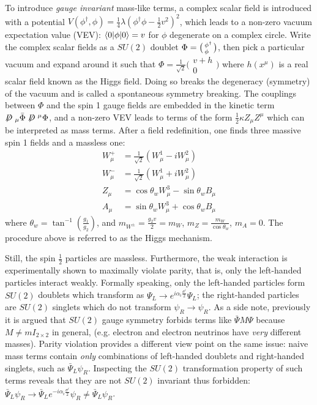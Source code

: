 To introduce \emph{gauge invariant} mass-like terms,
a complex scalar field is introduced with a potential
$V(\phi^\dagger, \phi) = \frac{1}{4}\lambda \left(\phi^\dagger \phi - \frac{1}{2}v^2\right)^2$,
which leads to a non-zero vacuum expectation value (VEV):
$\langle0\rvert\phi\lvert0\rangle = v$ for $\phi$ degenerate on a complex circle.
Write the complex scalar fields as a $SU(2)$ doublet
$\Phi = \bigl(\begin{smallmatrix} \phi^\dagger \\ \phi^{\hphantom{\dagger}} \end{smallmatrix}\bigr)$,
then pick a particular vacuum and expand around it such that
$\Phi = \frac{1}{\sqrt{2}} \bigl(\begin{smallmatrix} v + h \\ 0 \end{smallmatrix}\bigr)$
where $h(x^\mu)$ is a real scalar field known as the Higgs field.
Doing so breaks the degeneracy (symmetry) of the vacuum and is called a
spontaneous symmetry breaking.
The couplings between $\Phi$ and the spin 1 gauge fields are embedded in the
kinetic term $\fsl{D}_\mu \bar\Phi \fsl{D}^\mu \Phi$,
and a non-zero VEV leads to terms of the form $\frac{1}{2}\kappa Z_\mu Z^\mu$ which
can be interpreted as mass terms.
After a field redefinition, one finds three massive spin 1 fields and a massless
one:
\begin{align}
    W^+_\mu &= \frac{1}{\sqrt{2}}(W^1_\mu - i W^2_\mu) \\
    W^-_\mu &= \frac{1}{\sqrt{2}}(W^1_\mu + i W^2_\mu) \\
    Z_\mu &= \cos\theta_w W^3_\mu - \sin\theta_w B_\mu \\
    A_\mu &= \sin\theta_w W^3_\mu + \cos\theta_w B_\mu
\end{align}
where $\theta_w = \tan^{-1}\left(\frac{g_1}{g_2}\right)$,
and $m_{W^\pm} = \frac{g_2 v}{2} = m_W$, $m_Z = \frac{m_W}{\cos\theta_w}$,
$m_A = 0$.
The procedure above is referred to as the Higgs mechanism.

Still, the spin $\frac{1}{2}$ particles are massless.
Furthermore, the weak interaction is experimentally shown to maximally violate
parity,
that is, only the left-handed particles interact weakly.
Formally speaking, only the left-handed particles form $SU(2)$ doublets
which transform as
$\Psi_L \rightarrow e^{i \alpha_i \frac{\sigma^i}{2}} \Psi_L$;
the right-handed particles are $SU(2)$ singlets which do not transform
$\psi_R \rightarrow \psi_R$.
As a side note, previously it is argued that $SU(2)$ gauge symmetry forbids
terms like $\bar{\Psi} M \Psi$ because $M \neq m I_{2 \times 2}$ in
general,
(e.g. electron and electron neutrinos have \emph{very} different masses).
Parity violation provides a different view point on the same issue:
naive mass terms contain \emph{only} combinations of left-handed doublets
and right-handed singlets, such as $\bar{\Psi}_L \psi_R$.
Inspecting the $SU(2)$ transformation property of such terms reveals that
they are not $SU(2)$ invariant thus forbidden:
$\bar{\Psi}_L \psi_R \rightarrow \bar{\Psi}_L e^{-i \alpha_i \frac{\sigma^i}{2}} \psi_R \neq \bar{\Psi}_L \psi_R$.

